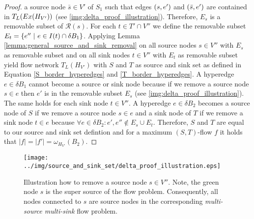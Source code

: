 \begin{proof}
a source node $\bar{s} \in V'$ of $S_1$ such that edges $(s,e')$ and $(\bar{s},e')$
are contained in $T_L(Ex(H_{V'}))$ (see \autoref{img:delta_proof_illustration}). Therefore, $E_s$ is a removable subset of $\mathcal{R}(s)$.
For each $t \in T' \cap V''$ we define the removable subset $E_t = \{e''\ |\ e \in I(t) \cap \delta B_1\}$.
Applying Lemma \ref{lemma:general_source_and_sink_removal} on all source nodes $s \in V''$
with $E_s$ as removable subset and on all sink nodes $t \in V''$ with $E_t$ 
as removable subset yield flow network $T_L(H_{V'})$ with $S$ and $T$ as source and sink 
set as defined in Equation \ref{S_border_hyperedges} and \ref{T_border_hyperedges}.
A hyperedge $e \in \delta B_1$ cannot become a source or sink node because if we remove a 
source node $s \in e$ then $e'$ is in the removable subset $E_s$ (see \autoref{img:delta_proof_illustration}). The same holds
for each sink node $t \in V''$. A hyperedge $e \in \delta B_2$ becomes a source node of $S$
if we remove a source node $s \in e$ and a sink node of $T$ if we remove a 
sink node $t \in e$ because $\forall e \in \delta B_2: e',e'' \notin E_s \cup E_t$. 
Therefore, $S$ and $T$ are equal to our source and sink set defintion and
for a maximum $(S,T)$-flow $f$ it holds that $|f| = |f'| = \omega_{H_{V'}}(B_2)$.
\end{proof}

\begin{figure}
\centering
\texttt{[image: ../img/source\_and\_sink\_set/delta\_proof\_illustration.eps]}
\caption{Illustration how to remove a source node $s \in V''$. Note, the green node $s$
         is the super source of the flow problem. Consequently, all nodes connected to $s$
         are source nodes in the corresponding \emph{multi-source multi-sink} flow problem.}
\label{img:delta_proof_illustration}
\end{figure}



